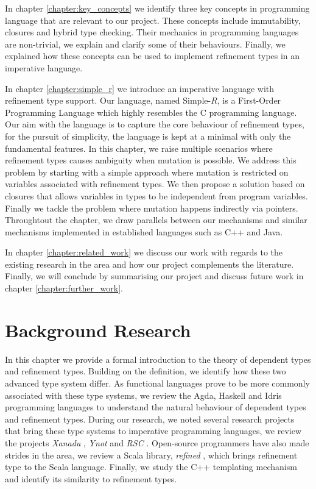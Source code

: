 \documentclass[a4paper,12pt]{report}
\begin{document}
\par
In chapter \ref{chapter:key_concepts} we identify three key concepts in 
programming language that are relevant to our project. These concepts include 
immutability, closures and hybrid type checking. Their mechanics in programming 
languages are non-trivial, we explain and clarify some of their behaviours. 
Finally, we explained how these concepts can be used to implement refinement 
types in an imperative language.

\par
In chapter \ref{chapter:simple_r} we introduce an imperative 
language with refinement type support. 
Our language, named Simple-$R$, is a First-Order Programming Language which 
highly resembles the C programming language. Our aim with the language is to 
capture the core behaviour of refinement types, for the pursuit 
of simplicity, the language is kept at a minimal with only the fundamental features. 
In this chapter, we raise multiple scenarios where refinement types 
causes ambiguity when mutation is possible. We address this problem by starting 
with a simple approach where mutation is restricted on variables associated with 
refinement types. We then propose a solution based on closures that allows 
variables in types to be independent from program variables. Finally we tackle 
the problem where mutation happens indirectly via pointers. Throughtout the chapter, 
we draw parallels between our mechanisms and similar mechanisms 
implemented in established languages such as C++ and Java. 

\par
In chapter \ref{chapter:related_work} we discuss our work with regards to the 
existing research in the area and how our project complements the literature.
Finally, we will conclude by summarising our project and discuss future work in 
chapter \ref{chapter:further_work}. 

\chapter{Background Research} \label{chapter:background}
In this chapter we provide a formal introduction to the theory of dependent 
types and refinement types. Building on the definition, we identify how these two 
advanced type system differ. As functional languages prove to be more 
commonly associated with these type systems, we review the Agda, Haskell and Idris 
programming languages to understand the natural behaviour of dependent types 
and refinement types. During our research, we noted several research projects  
that bring these type systems to imperative programming languages, we review 
the projects \textit{Xanadu} \cite{xanadu}, \textit{Ynot} \cite{ynot} and 
\textit{RSC} \cite{rts}. Open-source programmers have also made strides in 
the area, we review a Scala library, \textit{refined} \cite{refinedScala}, 
which brings refinement type to the Scala language. Finally, we study the C++ 
templating mechanism and identify its similarity to refinement types. 
\end{document}
